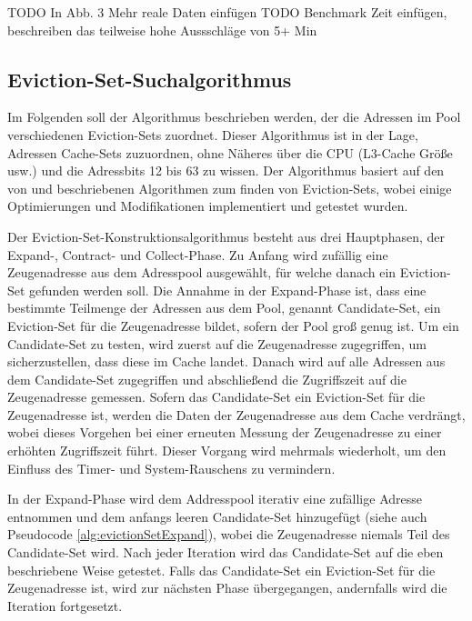 TODO In Abb. 3 Mehr reale Daten einfügen
TODO Benchmark Zeit einfügen, beschreiben das teilweise hohe Aussschläge von 5+ Min


\subsection{Eviction-Set-Suchalgorithmus}
\label{evictionSetSearchAlgo}

Im Folgenden soll der Algorithmus beschrieben werden, der die Adressen im Pool verschiedenen Eviction-Sets zuordnet.
Dieser Algorithmus ist in der Lage, Adressen Cache-Sets zuzuordnen, ohne Näheres über die CPU (L3-Cache Größe usw.) und die Adressbits 12 bis 63 zu wissen.
Der Algorithmus basiert auf den von \cite{DriveByPaper} und \cite{PrimeAndAbort} beschriebenen Algorithmen zum finden von Eviction-Sets, wobei einige Optimierungen und Modifikationen implementiert und getestet wurden.

Der Eviction-Set-Konstruktionsalgorithmus besteht aus drei Hauptphasen, der Expand-, Contract- und Collect-Phase. 
Zu Anfang wird zufällig eine Zeugenadresse aus dem Adresspool ausgewählt, für welche danach ein Eviction-Set gefunden werden soll.
Die Annahme in der Expand-Phase ist, dass eine bestimmte Teilmenge der Adressen aus dem Pool, genannt Candidate-Set, ein Eviction-Set für die Zeugenadresse bildet, sofern der Pool groß genug ist. 
Um ein Candidate-Set zu testen, wird zuerst auf die Zeugenadresse zugegriffen, um sicherzustellen, dass diese im Cache landet.
Danach wird auf alle Adressen aus dem Candidate-Set zugegriffen und abschließend die Zugriffszeit auf die Zeugenadresse gemessen. 
Sofern das Candidate-Set ein Eviction-Set für die Zeugenadresse ist, werden die Daten der Zeugenadresse aus dem Cache verdrängt, wobei dieses Vorgehen bei einer erneuten Messung der Zeugenadresse zu einer erhöhten Zugriffszeit führt.
Dieser Vorgang wird mehrmals wiederholt, um den Einfluss des Timer- und System-Rauschens zu vermindern.

In der Expand-Phase wird dem Addresspool iterativ eine zufällige Adresse entnommen und dem anfangs leeren Candidate-Set hinzugefügt (siehe auch Pseudocode \ref{alg:evictionSetExpand}), wobei die Zeugenadresse niemals Teil des Candidate-Set wird.
Nach jeder Iteration wird das Candidate-Set auf die eben beschriebene Weise getestet.
Falls das Candidate-Set ein Eviction-Set für die Zeugenadresse ist, wird zur nächsten Phase übergegangen, andernfalls wird die Iteration fortgesetzt.

